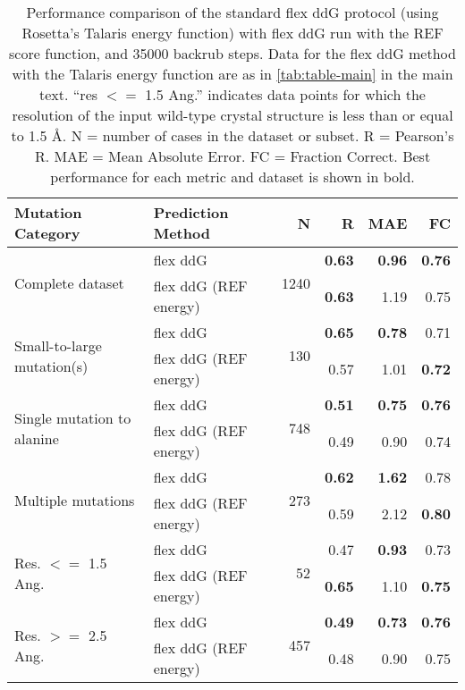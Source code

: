 \begin{table}
  \begin{tabular}{llrrrr}
\toprule
Mutation Category &      Prediction Method &     N &    R &  MAE &   FC \\
\midrule
 \multirow{ 2}{*}{Complete dataset} & flex ddG & \multirow{ 2}{*}{1240} & \textbf{0.63} & \textbf{0.96} & \textbf{0.76}  \\
 & flex ddG (REF energy) & & \textbf{0.63} & 1.19 & 0.75  \\
\hline
 \multirow{ 2}{*}{Small-to-large mutation(s)} & flex ddG & \multirow{ 2}{*}{130} & \textbf{0.65} & \textbf{0.78} & 0.71  \\
 & flex ddG (REF energy) & & 0.57 & 1.01 & \textbf{0.72}  \\
\hline
 \multirow{ 2}{*}{Single mutation to alanine} & flex ddG & \multirow{ 2}{*}{748} & \textbf{0.51} & \textbf{0.75} & \textbf{0.76}  \\
 & flex ddG (REF energy) & & 0.49 & 0.90 & 0.74  \\
\hline
 \multirow{ 2}{*}{Multiple mutations} & flex ddG & \multirow{ 2}{*}{273} & \textbf{0.62} & \textbf{1.62} & 0.78  \\
 & flex ddG (REF energy) & & 0.59 & 2.12 & \textbf{0.80}  \\
\hline
 \multirow{ 2}{*}{Res. $<=$ 1.5 Ang.} & flex ddG & \multirow{ 2}{*}{52} & 0.47 & \textbf{0.93} & 0.73  \\
 & flex ddG (REF energy) & & \textbf{0.65} & 1.10 & \textbf{0.75}  \\
\hline
 \multirow{ 2}{*}{Res. $>=$ 2.5 Ang.} & flex ddG & \multirow{ 2}{*}{457} & \textbf{0.49} & \textbf{0.73} & \textbf{0.76}  \\
 & flex ddG (REF energy) & & 0.48 & 0.90 & 0.75  \\
\bottomrule
\end{tabular}
  \caption[REF results]{
    Performance comparison of the standard flex ddG protocol (using Rosetta's Talaris energy function) with flex ddG run with the REF score function, and 35000 backrub steps. Data for the flex ddG method with the Talaris energy function are as in \cref{tab:table-main} in the main text. ``res $<=$ 1.5 Ang.'' indicates data points for which the resolution of the input wild-type crystal structure is less than or equal to 1.5 \AA. N = number of cases in the dataset or subset. R = Pearson's R. MAE = Mean Absolute Error. FC = Fraction Correct. Best performance for each metric and dataset is shown in bold.
  } \label{tab:table-ref}
\end{table}
